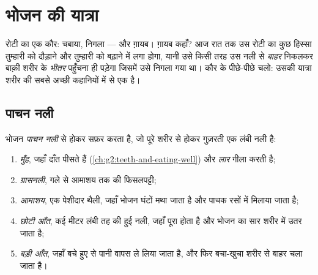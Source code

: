 \chapter{भोजन की यात्रा}\label{ch:g4:journey-of-food}

रोटी का एक कौर: चबाया, निगला --- और ग़ायब। ग़ायब कहाँ? आज रात तक उस
रोटी का कुछ हिस्सा तुम्हारी  को दौड़ाने और तुम्हारी  को
बढ़ाने में लगा होगा, यानी उसे किसी तरह उस नली से \emph{बाहर} निकलकर
बाक़ी शरीर के \emph{भीतर} पहुँचना ही पड़ेगा जिसमें उसे निगला गया था।
कौर के पीछे-पीछे चलो: उसकी यात्रा शरीर की सबसे अच्छी कहानियों में से
एक है।

\section{पाचन नली}

\begin{definition}[पाचन नली]\label{def:g4:journey-of-food:tract}
भोजन \emph{पाचन नली} से होकर सफ़र करता है, जो पूरे शरीर
से होकर गुज़रती एक लंबी नली है:
\begin{enumerate}
  \item \emph{मुँह}, जहाँ दाँत पीसते हैं
        (\cref{ch:g2:teeth-and-eating-well}) और \emph{लार}
        गीला करती है;
  \item \emph{ग्रासनली}, गले से आमाशय तक की फिसलपट्टी;
  \item \emph{आमाशय}, एक पेशीदार थैली, जहाँ भोजन घंटों
        मथा जाता है और पाचक रसों में मिलाया जाता है;
  \item \emph{छोटी आँत}, कई मीटर लंबी तह की हुई नली,
        जहाँ  पूरा होता है और भोजन का सार शरीर में उतर जाता है;
  \item \emph{बड़ी आँत}, जहाँ बचे हुए से पानी वापस ले
        लिया जाता है, और फिर बचा-खुचा शरीर से बाहर चला जाता है।
\end{enumerate}
\end{definition}

